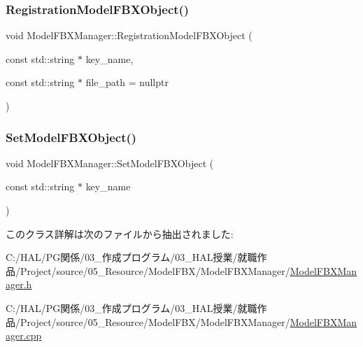 \subsubsection{\texorpdfstring{Registration\+Model\+F\+B\+X\+Object()}{RegistrationModelFBXObject()}}
{\footnotesize\ttfamily void Model\+F\+B\+X\+Manager\+::\+Registration\+Model\+F\+B\+X\+Object (\begin{DoxyParamCaption}\item[{const std\+::string $\ast$}]{key\+\_\+name,  }\item[{const std\+::string $\ast$}]{file\+\_\+path = {\ttfamily nullptr} }\end{DoxyParamCaption})}

\mbox{\label{class_model_f_b_x_manager_a1b25dfc755e529dc5f61913697ef99d1}} 
\subsubsection{\texorpdfstring{Set\+Model\+F\+B\+X\+Object()}{SetModelFBXObject()}}
{\footnotesize\ttfamily void Model\+F\+B\+X\+Manager\+::\+Set\+Model\+F\+B\+X\+Object (\begin{DoxyParamCaption}\item[{const std\+::string $\ast$}]{key\+\_\+name }\end{DoxyParamCaption})}



このクラス詳解は次のファイルから抽出されました\+:\begin{DoxyCompactItemize}
\item 
C\+:/\+H\+A\+L/\+P\+G関係/03\+\_\+作成プログラム/03\+\_\+\+H\+A\+L授業/就職作品/\+Project/source/05\+\_\+\+Resource/\+Model\+F\+B\+X/\+Model\+F\+B\+X\+Manager/\mbox{\hyperlink{_model_f_b_x_manager_8h}{Model\+F\+B\+X\+Manager.\+h}}\item 
C\+:/\+H\+A\+L/\+P\+G関係/03\+\_\+作成プログラム/03\+\_\+\+H\+A\+L授業/就職作品/\+Project/source/05\+\_\+\+Resource/\+Model\+F\+B\+X/\+Model\+F\+B\+X\+Manager/\mbox{\hyperlink{_model_f_b_x_manager_8cpp}{Model\+F\+B\+X\+Manager.\+cpp}}\end{DoxyCompactItemize}
